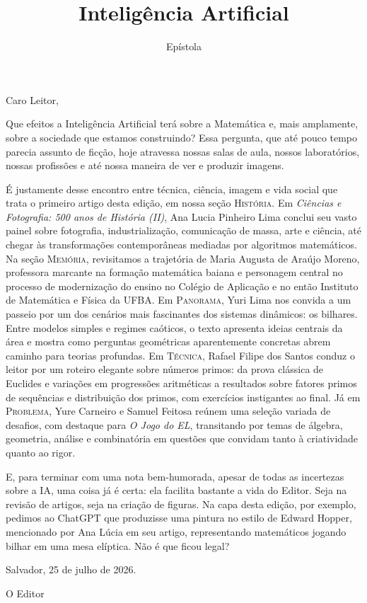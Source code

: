 \documentclass[onecolumn]{hipatia}
\title{Inteligência Artificial}
\subtitle{Epístola}
\author{}
\begin{document}
\setcounter{page}{\epistolapage}
\maketitle
\leftskip=2.2cm
\rightskip=2.2cm

\noindent Caro Leitor,
\vspace{0.4cm}

\noindent Que efeitos a Inteligência Artificial terá sobre a Matemática e, mais amplamente, sobre a sociedade que estamos construindo? Essa pergunta, que até pouco tempo parecia assunto de ficção, hoje atravessa nossas salas de aula, nossos laboratórios, nossas profissões e até nossa maneira de ver e produzir imagens.

\noindent É justamente desse encontro entre técnica, ciência, imagem e vida social que trata o primeiro artigo desta edição, em nossa seção \textsc{História}. Em \textit{Ciências e Fotografia: 500 anos de História (II)}, Ana Lucia Pinheiro Lima conclui seu vasto painel sobre fotografia, industrialização, comunicação de massa, arte e ciência, até chegar às transformações contemporâneas mediadas por algoritmos matemáticos.
Na seção \textsc{Memória}, revisitamos a trajetória de Maria Augusta de Araújo Moreno, professora marcante na formação matemática baiana e personagem central no processo de modernização do ensino no Colégio de Aplicação e no então Instituto de Matemática e Física da UFBA.
Em \textsc{Panorama}, Yuri Lima nos convida a um passeio por um dos cenários mais fascinantes dos sistemas dinâmicos: os bilhares. Entre modelos simples e regimes caóticos, o texto apresenta ideias centrais da área e mostra como perguntas geométricas aparentemente concretas abrem caminho para teorias profundas.
Em \textsc{Técnica}, Rafael Filipe dos Santos conduz o leitor por um roteiro elegante sobre números primos: da prova clássica de Euclides e variações em progressões aritméticas a resultados sobre fatores primos de sequências e distribuição dos primos, com exercícios instigantes ao final.
Já em \textsc{Problema}, Yure Carneiro e Samuel Feitosa reúnem uma seleção variada de desafios, com destaque para \textit{O Jogo do EL}, transitando por temas de álgebra, geometria, análise e combinatória em questões que convidam tanto à criatividade quanto ao rigor.

\noindent E, para terminar com uma nota bem-humorada, apesar de todas as incertezas sobre a IA, uma coisa já é certa: ela facilita bastante a vida do Editor. Seja na revisão de artigos, seja na criação de figuras. Na capa desta edição, por exemplo, pedimos ao ChatGPT que produzisse uma pintura no estilo de Edward Hopper,
mencionado por Ana Lúcia em seu artigo, representando matemáticos jogando bilhar em uma mesa elíptica.
Não é que ficou legal?

\vspace{0.6cm}

\hfill Salvador, 25 de julho de 2026.

\hfill O Editor
\end{document}
